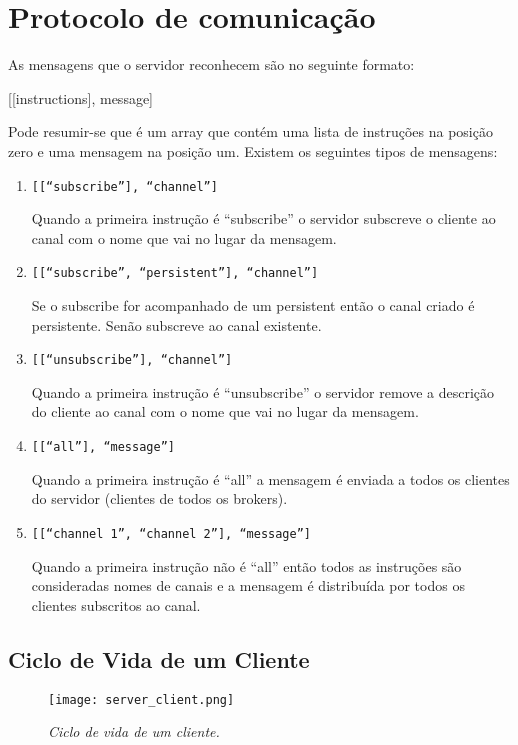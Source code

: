 
\section{Protocolo de comunicação}
\label{sec:protocolo}

As mensagens que o servidor reconhecem são no seguinte formato:

[[instructions], message]

Pode resumir-se que é um array que contém uma lista de instruções na posição zero e uma mensagem na posição um. Existem os seguintes tipos de mensagens:

\begin{enumerate}
\item
\texttt{[[``subscribe''], ``channel'']}

Quando a primeira instrução é ``subscribe'' o servidor subscreve o cliente ao canal com o nome que vai no lugar da mensagem.

\item
\texttt{[[``subscribe'', ``persistent''], ``channel'']}

Se o subscribe for acompanhado de um persistent então o canal criado é persistente. Senão subscreve ao canal existente.

\item
\texttt{[[``unsubscribe''], ``channel'']}

Quando a primeira instrução é ``unsubscribe'' o servidor remove a descrição do cliente ao canal com o nome que vai no lugar da mensagem.

\item
\texttt{[[``all''], ``message'']}

Quando a primeira instrução é ``all'' a mensagem é enviada a todos os clientes do servidor (clientes de todos os brokers).

\item
\texttt{[[``channel 1'', ``channel 2''], ``message'']}

Quando a primeira instrução não é ``all'' então todos as instruções são consideradas nomes de canais e a mensagem é distribuída por todos os clientes subscritos ao canal.

\end{enumerate}

\subsection{Ciclo de Vida de um Cliente}

\begin{figure}[H]
\centering
\texttt{[image: server\_client.png]}
\caption{\textit{Ciclo de vida de um cliente.}}
\label{fig:server-client}
\end{figure}

